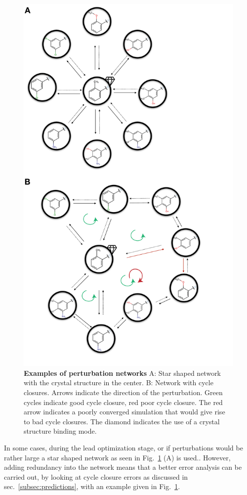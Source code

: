 \documentclass[9pt,bestpractices]{livecoms}
\begin{document}
\begin{figure}[h!]
    \includegraphics[width=0.95\columnwidth]{figures/fig6_types_of_networks/Figure.pdf}
    \caption{\textbf{Examples of perturbation networks} A: Star shaped network with the crystal structure in the center. B: Network with cycle closures. Arrows indicate the direction of the perturbation. Green cycles indicate good cycle closure, red poor cycle closure. The red arrow indicates a poorly converged simulation that would give rise to bad cycle closures. The diamond indicates the use of a crystal structure binding mode.}
    \label{fig:fig_types_of_networks}
\end{figure} 
In some cases, during the lead optimization stage, or if perturbations would be rather large a star shaped network as seen in Fig.~\ref{fig:fig_types_of_networks} (A) is used.. However, adding redundancy into the network means that a better error analysis can be carried out, by looking at cycle closure errors as discussed in sec.~\ref{subsec:predictions}, with an example given in Fig.~\ref{fig:fig_types_of_networks}.
\end{document}
